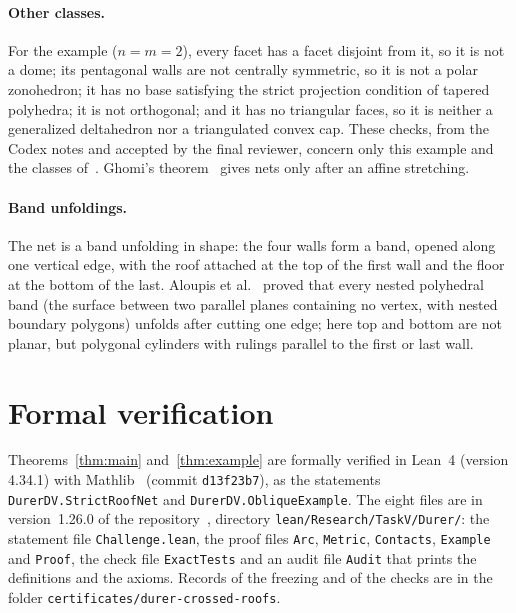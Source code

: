 \documentclass[11pt]{article}
\theoremstyle{definition}
\theoremstyle{remark}
\newcommand{\repoversion}{1.26.0}
\begin{document}
\paragraph{Other classes.} For the example ($n=m=2$), every facet has a facet
disjoint from it, so it is not a dome; its pentagonal walls are not centrally
symmetric, so it is not a polar zonohedron; it has no base satisfying the
strict projection condition of tapered polyhedra; it is not orthogonal; and it
has no triangular faces, so it is neither a generalized deltahedron nor a
triangulated convex cap. These checks, from the Codex notes and accepted by
the final reviewer, concern only this example and the classes
of~\cite{do25}. Ghomi's theorem~\cite{ghomi} gives nets only after an affine
stretching.

\paragraph{Band unfoldings.} The net is a band unfolding in shape: the four
walls form a band, opened along one vertical edge, with the roof attached at
the top of the first wall and the floor at the bottom of the last. Aloupis et
al.~\cite{aloupis} proved that every nested polyhedral band (the surface
between two parallel planes containing no vertex, with nested boundary
polygons) unfolds after cutting one edge; here top and bottom are not planar,
but polygonal cylinders with rulings parallel to the first or last wall.

\section{Formal verification}\label{sec:lean}

Theorems~\ref{thm:main} and~\ref{thm:example} are formally verified in Lean~4
(version 4.34.1) with Mathlib~\cite{mathlib} (commit \texttt{d13f23b7}), as
the statements \texttt{DurerDV.StrictRoofNet} and
\texttt{DurerDV.ObliqueExample}. The eight files are in version~\repoversion{}
of the repository~\cite{repo}, directory
\texttt{lean/Research/TaskV/Durer/}: the statement file
\texttt{Challenge.lean}, the proof files \texttt{Arc}, \texttt{Metric},
\texttt{Contacts}, \texttt{Example} and \texttt{Proof}, the check file
\texttt{ExactTests} and an audit file \texttt{Audit} that prints the
definitions and the axioms. Records of the freezing and of the checks are in
the folder \texttt{certificates/durer-crossed-roofs}.
\end{document}
